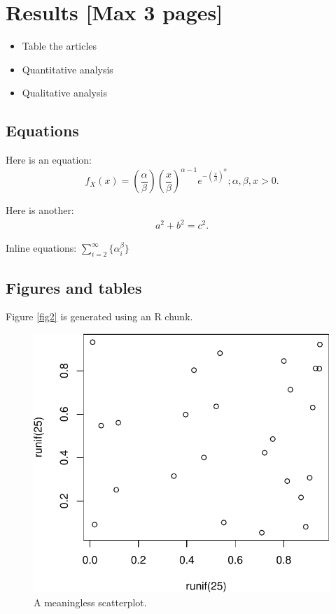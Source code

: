 \documentclass[preprint, 3p,
authoryear]{elsarticle} %
\providecommand{\tightlist}{%
  \setlength{\itemsep}{0pt}\setlength{\parskip}{0pt}}
\begin{document}
\hypertarget{results-max-3-pages}{%
\section{Results {[}Max 3 pages{]}}\label{results-max-3-pages}}

\begin{itemize}
\tightlist
\item
  Table the articles
\item
  Quantitative analysis
\item
  Qualitative analysis
\end{itemize}

\hypertarget{equations}{%
\subsection{Equations}\label{equations}}

Here is an equation: \[ 
  f_{X}(x) = \left(\frac{\alpha}{\beta}\right)
  \left(\frac{x}{\beta}\right)^{\alpha-1}
  e^{-\left(\frac{x}{\beta}\right)^{\alpha}}; 
  \alpha,\beta,x > 0 .
\]

Here is another: \begin{align}
  a^2+b^2=c^2.
\end{align}

Inline equations: \(\sum_{i = 2}^\infty\{\alpha_i^\beta\}\)

\hypertarget{figures-and-tables}{%
\subsection{Figures and tables}\label{figures-and-tables}}

Figure \ref{fig2} is generated using an R chunk.

\begin{figure}

{\centering \includegraphics[width=0.5\linewidth]{Article-template_files/figure-latex/fig2-1} 

}

\caption{\label{fig2}A meaningless scatterplot.}\label{fig:fig2}
\end{figure}
\end{document}

